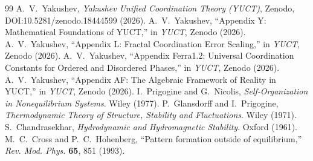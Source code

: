 \documentclass[12pt,a4paper]{article}
\begin{document}
	\begin{thebibliography}{99}
		 A.~V.~Yakushev, \emph{Yakushev Unified Coordination Theory (YUCT)}, Zenodo, DOI:10.5281/zenodo.18444599 (2026).
		 A.~V.~Yakushev, ``Appendix Y: Mathematical Foundations of YUCT,'' in \emph{YUCT}, Zenodo (2026).
		 A.~V.~Yakushev, ``Appendix L: Fractal Coordination Error Scaling,'' in \emph{YUCT}, Zenodo (2026).
		 A.~V.~Yakushev, ``Appendix Ferra1.2: Universal Coordination Constants for Ordered and Disordered Phases,'' in \emph{YUCT}, Zenodo (2026).
		 A.~V.~Yakushev, ``Appendix AF: The Algebraic Framework of Reality in YUCT,'' in \emph{YUCT}, Zenodo (2026).
		 I.~Prigogine and G.~Nicolis, \emph{Self‑Organization in Nonequilibrium Systems}. Wiley (1977).
		 P.~Glansdorff and I.~Prigogine, \emph{Thermodynamic Theory of Structure, Stability and Fluctuations}. Wiley (1971).
		 S.~Chandrasekhar, \emph{Hydrodynamic and Hydromagnetic Stability}. Oxford (1961).
		 M.~C.~Cross and P.~C.~Hohenberg, ``Pattern formation outside of equilibrium,'' \emph{Rev. Mod. Phys.} \textbf{65}, 851 (1993).
	\end{thebibliography}
	
\end{document}

